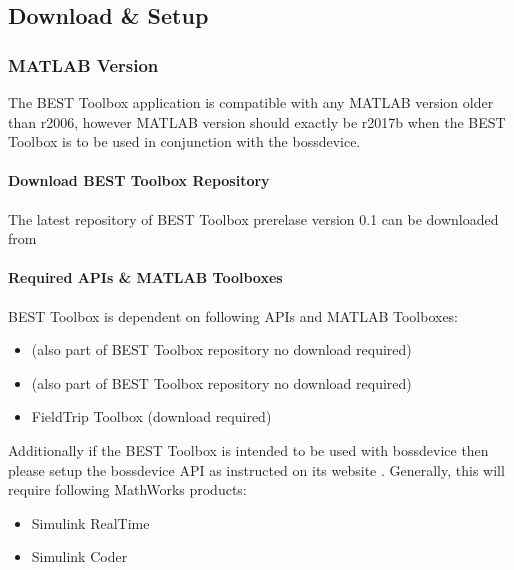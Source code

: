 \documentclass[letterpaper,10pt,english]{sphinxmanual}
\begin{document}
\subsection{Download \& Setup}
\label{\detokenize{2_DownloadAndSetup:download-setup}}\label{\detokenize{2_DownloadAndSetup::doc}}

\subsubsection{MATLAB Version}
\label{\detokenize{2_DownloadAndSetup:matlab-version}}
\sphinxAtStartPar
The BEST Toolbox application is compatible with any MATLAB version older than r2006, however MATLAB version should exactly be r2017b when the BEST Toolbox is to be used in conjunction with the bossdevice.


\paragraph{Download BEST Toolbox Repository}
\label{\detokenize{2_DownloadAndSetup:download-best-toolbox-repository}}
\sphinxAtStartPar
The latest repository of BEST Toolbox prerelase version 0.1 can be downloaded from 


\paragraph{Required APIs \& MATLAB Toolboxes}
\label{\detokenize{2_DownloadAndSetup:required-apis-matlab-toolboxes}}
\sphinxAtStartPar
BEST Toolbox is dependent on following APIs and MATLAB Toolboxes:
\begin{itemize}
\item {} 
\sphinxAtStartPar
{}  (also part of BEST Toolbox repository \textendash{} no download required)

\item {} 
\sphinxAtStartPar
{}  (also part of BEST Toolbox repository \textendash{} no download required)

\item {} 
\sphinxAtStartPar
FieldTrip Toolbox (download required)

\end{itemize}

\sphinxAtStartPar
Additionally if the BEST Toolbox is intended to be used with bossdevice then please setup the bossdevice API as instructed on its website .  Generally, this will require following MathWorks products:
\begin{itemize}
\item {} 
\sphinxAtStartPar
Simulink Real\sphinxhyphen{}Time

\item {} 
\sphinxAtStartPar
Simulink Coder

\end{itemize}
\end{document}
